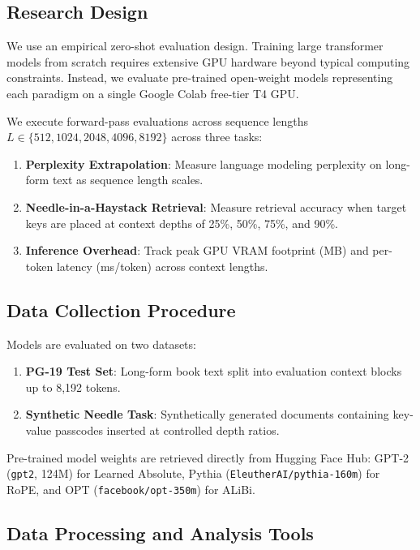 \documentclass[conference]{IEEEtran}
\begin{document}
\subsection{Research Design}

We use an empirical zero-shot evaluation design. Training large transformer models from scratch requires extensive GPU hardware beyond typical computing constraints. Instead, we evaluate pre-trained open-weight models representing each paradigm on a single Google Colab free-tier T4 GPU.

We execute forward-pass evaluations across sequence lengths $L \in \{512, 1024, 2048, 4096, 8192\}$ across three tasks:
\begin{enumerate}
\item \textbf{Perplexity Extrapolation}: Measure language modeling perplexity on long-form text as sequence length scales.
\item \textbf{Needle-in-a-Haystack Retrieval}: Measure retrieval accuracy when target keys are placed at context depths of 25\%, 50\%, 75\%, and 90\%.
\item \textbf{Inference Overhead}: Track peak GPU VRAM footprint (MB) and per-token latency (ms/token) across context lengths.
\end{enumerate}

\subsection{Data Collection Procedure}

Models are evaluated on two datasets:
\begin{enumerate}
\item \textbf{PG-19 Test Set}: Long-form book text split into evaluation context blocks up to 8,192 tokens.
\item \textbf{Synthetic Needle Task}: Synthetically generated documents containing key-value passcodes inserted at controlled depth ratios.
\end{enumerate}
Pre-trained model weights are retrieved directly from Hugging Face Hub: GPT-2 (\texttt{gpt2}, 124M) for Learned Absolute, Pythia (\texttt{EleutherAI/pythia-160m}) for RoPE, and OPT (\texttt{facebook/opt-350m}) for ALiBi.

\subsection{Data Processing and Analysis Tools}
\end{document}
